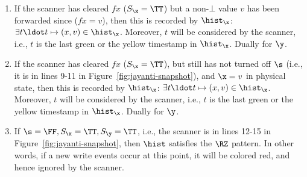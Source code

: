 \begin{enumerate}

\item\label{inv:forward} If the scanner has cleared $\mathit{fx}$
  ($\sx = \TT$) but a non-$\bot$ value $v$ has been forwarded since
  ($\mathit{fx} = v$), then this is recorded by $\histx$:
  $\exists t\ldot t \mapsto (x, v) \in \histx$. Moreover, $t$ will be
  considered by the scanner, i.e., $t$ is the last green or the yellow
  timestamp in $\histx$. Dually for $\y$.


\item\label{inv:scanner} If the scanner has cleared $\mathit{fx}$
  ($\sx = \TT$), but still has not turned off $\s$ (i.e., it is in
  lines 9-11 in Figure~\ref{fig:jayanti-snapshot}), and $\x = v$ in
  physical state, then this is recorded by $\histx$:
  $\exists t\ldot t \mapsto (x, v) \in \histx$. Moreover, $t$ will be
  considered by the scanner, i.e., $t$ is the last green or the yellow
  timestamp in $\histx$. Dually for $\y$.


\item\label{inv:redzone} 
%
If $\s = \FF, \sx = \TT, \sy = \TT$, i.e., the scanner is in lines
12-15 in Figure~\ref{fig:jayanti-snapshot}, then $\hist$ satisfies the
$\RZ$ pattern. In other words, if a new write events occur at this
point, it will be colored red, and hence ignored by the scanner.


\end{enumerate}
